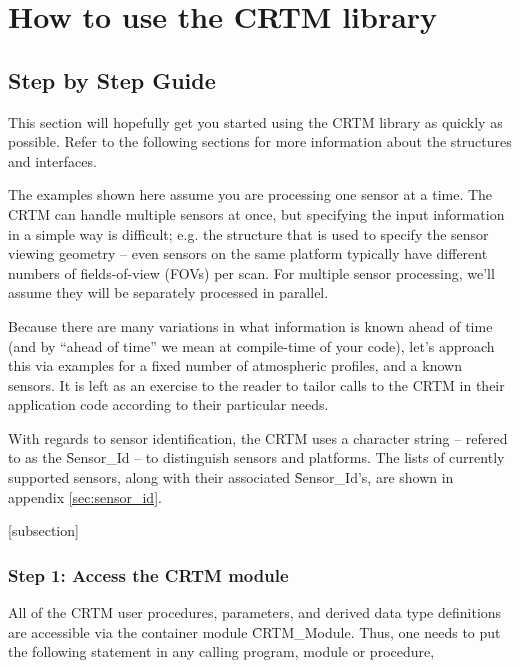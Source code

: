 \chapter{How to use the CRTM library}
\section{Step by Step Guide}
This section will hopefully get you started using the CRTM library as quickly as possible. Refer to the following sections for more information about the structures and interfaces.

The examples shown here assume you are processing one sensor at a time. The CRTM can handle multiple sensors at once, but specifying the input information in a simple way is difficult; e.g. the \hyperref[sec:geometry_structure]{\Geometry} structure that is used to specify the sensor viewing geometry -- even sensors on the same platform typically have different numbers of fields-of-view (FOVs) per scan. For multiple sensor processing, we'll assume they will be separately processed in parallel.

Because there are many variations in what information is known ahead of time (and by ``ahead of time'' we mean at compile-time of your code), let's approach this via examples for a fixed number of atmospheric profiles, and a known sensors. It is left as an exercise to the reader to tailor calls to the CRTM in their application code according to their particular needs.

With regards to sensor identification, the CRTM uses a character string -- refered to as the \f{Sensor\_Id} -- to distinguish sensors and platforms. The lists of currently supported sensors, along with their associated \f{Sensor\_Id}'s, are shown in appendix \ref{sec:sensor_id}.


[subsection]

\subsection{Step 1: Access the CRTM module}
\label{sec:access_step}
All of the CRTM user procedures, parameters, and derived data type definitions are accessible via the container module \f{CRTM\_Module}. Thus, one needs to put the following statement in any calling program, module or procedure,

